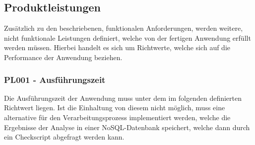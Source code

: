
\subsection{Produktleistungen}
Zusätzlich zu den beschriebenen, funktionalen Anforderungen, werden weitere, nicht funktionale Leistungen definiert, welche von der fertigen Anwendung erfüllt werden müssen. Hierbei handelt es sich um Richtwerte, welche sich auf die Performance der Anwendung beziehen.

\subsubsection{PL001 - Ausführungszeit}\label{subsubsec:PL001}
Die Ausführungszeit der Anwendung muss unter dem im folgenden definierten Richtwert liegen. Ist die Einhaltung von diesem nicht möglich, muss eine alternative für den Verarbeitungsprozess implementiert werden, welche die Ergebnisse der Analyse in einer NoSQL-Datenbank speichert, welche dann durch ein Checkscript abgefragt werden kann.

